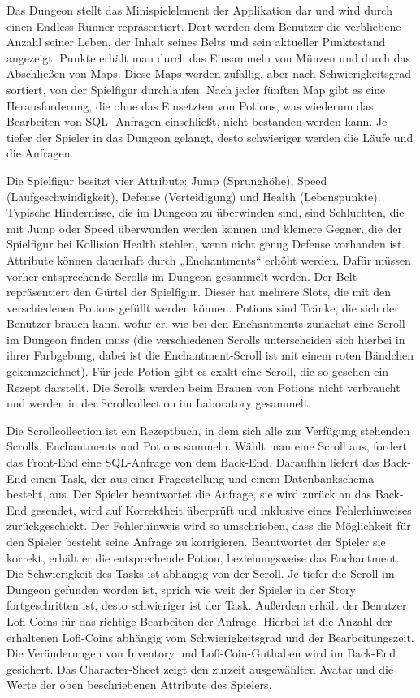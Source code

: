 Das Dungeon stellt das Minispielelement der Applikation dar und wird durch einen Endless-Runner repr\"asentiert. Dort werden dem Benutzer die 
verbliebene Anzahl seiner Leben, der Inhalt seines Belts und sein aktueller Punktestand angezeigt. Punkte erh\"alt man durch das Einsammeln von 
M\"unzen und durch das Abschlie{\ss}en von Maps. Diese Maps werden zuf\"allig, aber nach Schwierigkeitsgrad sortiert, von der Spielfigur 
durchlaufen. Nach jeder f\"unften Map gibt es eine Herausforderung, die ohne das Einsetzten von Potions, was wiederum das Bearbeiten von SQL-
Anfragen einschlie{\ss}t, nicht bestanden werden kann. Je tiefer der Spieler in das Dungeon gelangt, desto schwieriger werden die L\"aufe und die 
Anfragen.  

Die Spielfigur besitzt vier Attribute: Jump (Sprungh\"ohe), Speed (Laufgeschwindigkeit), Defense (Verteidigung) und Health (Lebenspunkte). 
Typische Hindernisse, die im Dungeon zu \"uberwinden sind, sind Schluchten, die mit Jump oder Speed \"uberwunden werden k\"onnen und 
kleinere Gegner, die der Spielfigur bei Kollision Health stehlen, wenn nicht genug Defense vorhanden ist. Attribute k\"onnen dauerhaft durch 
„Enchantments“ erh\"oht werden. Daf\"ur m\"ussen vorher entsprechende Scrolls im Dungeon gesammelt werden.
Der Belt repr\"asentiert den G\"urtel der Spielfigur. Dieser hat mehrere Slots, die mit den verschiedenen Potions gef\"ullt werden k\"onnen. Potions 
sind Tr\"anke, die sich der Benutzer brauen kann, wof\"ur er, wie bei den Enchantments zun\"achst eine Scroll im Dungeon finden muss (die 
verschiedenen Scrolls unterscheiden sich hierbei in ihrer Farbgebung, dabei ist die Enchantment-Scroll ist mit einem roten B\"andchen gekennzeichnet). 
F\"ur jede Potion gibt es exakt eine Scroll, die so gesehen ein Rezept darstellt. Die Scrolls werden beim Brauen von Potions nicht verbraucht und 
werden in der Scrollcollection im Laboratory gesammelt. 

Die Scrollcollection ist ein Rezeptbuch, in dem sich alle zur Verf\"ugung stehenden Scrolls, Enchantments und Potions sammeln. W\"ahlt man eine 
Scroll aus, fordert das Front-End eine SQL-Anfrage von dem Back-End. Daraufhin liefert das Back-End einen Task, der aus einer Fragestellung und 
einem Datenbankschema besteht, aus. %
Der Spieler beantwortet die Anfrage, sie wird zur\"uck an das Back-End gesendet, wird auf Korrektheit 
\"uberpr\"uft  und inklusive eines Fehlerhinweises zur\"uckgeschickt. Der Fehlerhinweis wird so umschrieben, dass die M\"oglichkeit f\"ur 
den Spieler besteht seine Anfrage zu korrigieren. Beantwortet der Spieler sie korrekt, erh\"alt er die entsprechende Potion, beziehungsweise das 
Enchantment. Die Schwierigkeit des Tasks ist abh\"angig von der Scroll. Je tiefer die Scroll im Dungeon gefunden worden ist, sprich wie weit der 
Spieler in der Story fortgeschritten ist, desto schwieriger ist der Task. 
Au{\ss}erdem erh\"alt der Benutzer Lofi-Coins f\"ur das richtige Bearbeiten der Anfrage. Hierbei ist die Anzahl der erhaltenen Lofi-Coins abh\"angig vom 
Schwierigkeitsgrad und der Bearbeitungszeit. Die Ver\"anderungen von Inventory und Lofi-Coin-Guthaben wird im Back-End gesichert.
Das Character-Sheet zeigt den zurzeit ausgew\"ahlten Avatar und die Werte der oben beschriebenen Attribute des Spielers.

